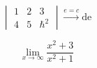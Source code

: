 
\begin{equation}
\begin{vmatrix}1&2&3\\4&5&\hbar^2\end{vmatrix}\xrightarrow{e = c}\mathrm{de}
\end{equation}

\begin{equation}
\lim_{x\to\infty}\frac{x^2+3}{x^2+1}
\end{equation}
